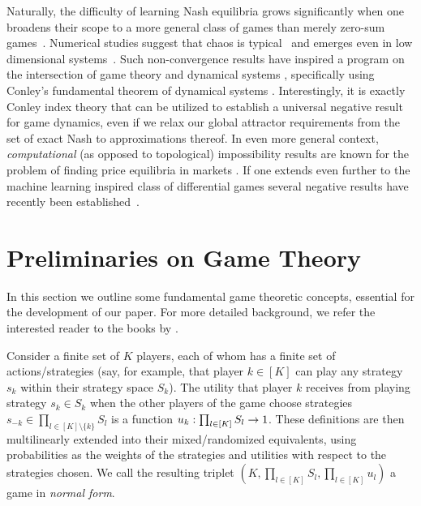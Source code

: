 \documentclass[11pt]{article}
\begin{document}
Naturally, the difficulty of learning Nash equilibria grows significantly  when one broadens their scope to a more general class of games than merely zero-sum games~\citep{daskalakis2010learning,paperics11,galla2013complex,DynMeaningOfTheGame}. 
Numerical studies suggest that chaos is typical~\citep{sanders2018prevalence} and emerges even in low dimensional systems~\citep{sato2002chaos,palaiopanos2017multiplicative, 2017arXiv170109043P}. 
Such non-convergence results have inspired a program on the intersection of game theory and dynamical systems \citep{Entropy18,DynMeaningOfTheGame}, specifically using Conley's fundamental theorem of dynamical systems \citep{conley1978isolated}. Interestingly, it is exactly Conley index theory that can be utilized to establish a universal negative result for game dynamics, even if we relax our global attractor requirements from the set of exact Nash to approximations  thereof.  In even more general context, {\em computational} (as opposed to topological) impossibility results are known for the problem of finding price equilibria in markets \citep{PapYannPrice}. If one extends even further to  the machine learning inspired class of differential games several negative results have recently been established~\citep{letcher2021impossibility,balduzzi2020smooth,hsieh2021limits,farnia2020gans}.



\section{Preliminaries on Game Theory}

In this section we outline some fundamental game theoretic concepts, essential for the development of our paper. For more detailed background, we refer the interested reader to the books by \citet{AGT_main_book,HofbauerSigmund,weibull_evolutionary_1998}.

Consider a finite set of $K$ players, each of whom has a finite set of actions/strategies (say, for example, that player $k\in [K]$ can play any strategy $s_k$ within their strategy space $S_k$). The utility that player $k$ receives from playing strategy $s_k\in S_k$ when the other players of the game choose strategies $s_{-k} \in \prod_{l\in [K]\setminus \{k\}} S_l$ is a function $u_k : \prod_{l\in [K]} S_l \to 1$. These definitions are then multilinearly extended into their mixed/randomized equivalents, using probabilities as the weights of the strategies and utilities with respect to the strategies chosen. We call the resulting triplet $(K, \prod_{l\in [K]} S_l, \prod_{l\in [K]} u_l)$ a game in {\em normal form}.
\end{document}
